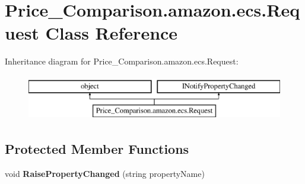 \hypertarget{class_price___comparison_1_1amazon_1_1ecs_1_1_request}{\section{Price\-\_\-\-Comparison.\-amazon.\-ecs.\-Request Class Reference}
\label{class_price___comparison_1_1amazon_1_1ecs_1_1_request}
}


 


Inheritance diagram for Price\-\_\-\-Comparison.\-amazon.\-ecs.\-Request\-:\begin{figure}[H]
\begin{center}
\leavevmode
\includegraphics[height=2.000000cm]{class_price___comparison_1_1amazon_1_1ecs_1_1_request}
\end{center}
\end{figure}
\subsection*{Protected Member Functions}
\begin{DoxyCompactItemize}
\item 
\hypertarget{class_price___comparison_1_1amazon_1_1ecs_1_1_request_a144a8c7b72ee02f456419718135f3bdf}{void {\bfseries Raise\-Property\-Changed} (string property\-Name)}\label{class_price___comparison_1_1amazon_1_1ecs_1_1_request_a144a8c7b72ee02f456419718135f3bdf}

\end{DoxyCompactItemize}
